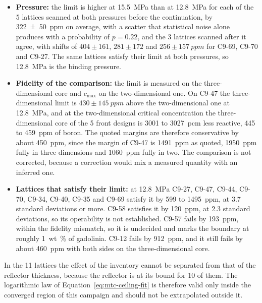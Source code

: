 \begin{itemize}
  \item \textbf{Pressure:} the limit is higher at \SI{15.5}{MPa} than at
        \SI{12.8}{MPa} for each of the 5 lattices scanned at both
        pressures before the continuation, by \SI{322(50)}{ppm} on
        average, with a scatter that statistical noise alone produces
        with a probability of $p = 0.22$, and the 3 lattices scanned
        after it agree, with shifts of $404 \pm 161$, $281 \pm 172$ and
        $256 \pm \SI{157}{ppm}$ for C9-69, C9-70 and C9-27.
        The same lattices satisfy their limit at both pressures, so
        \SI{12.8}{MPa} is the binding pressure.
  \item \textbf{Fidelity of the comparison:} the limit is measured on
        the three-dimensional core and $c_\mathrm{max}$ on the
        two-dimensional one. On C9-47 the three-dimensional limit is
        $430 \pm \SI{145}{ppm}$ above the two-dimensional one at
        \SI{12.8}{MPa}, and at the two-dimensional critical
        concentration the three-dimensional core of the 5 front designs
        is 3001 to \SI{3027}{pcm} less reactive, 445 to \SI{459}{ppm}
        of boron. The quoted margins are therefore conservative by about
        \SI{450}{ppm}, since the margin of C9-47 is \SI{1491}{ppm} as
        quoted, \SI{1950}{ppm} fully in three dimensions and
        \SI{1060}{ppm} fully in two. The comparison is not corrected,
        because a correction would mix a measured quantity with an
        inferred one.
  \item \textbf{Lattices that satisfy their limit:} at \SI{12.8}{MPa}
        C9-27, C9-47, C9-44, C9-70, C9-34, C9-40, C9-35 and C9-69
        satisfy it by 599 to \SI{1495}{ppm}, at 3.7 standard deviations
        or more. C9-58
        satisfies it by \SI{120}{ppm}, at 2.3 standard deviations, so
        its operability is not established. C9-57 fails by
        \SI{193}{ppm}, within the fidelity mismatch, so it is undecided
        and marks the boundary at roughly \SI{1}{wt\%} of gadolinia.
        C9-12 fails by \SI{912}{ppm}, and it still fails by about
        \SI{460}{ppm} with both sides on the three-dimensional core.
\end{itemize}

In the 11 lattices the effect of the inventory cannot be separated
from that of the reflector thickness, because the reflector is at its
bound for 10 of them. The logarithmic law of
Equation~\eqref{eq:mtc-ceiling-fit} is therefore valid only inside the
converged region of this campaign and should not be extrapolated
outside it.

